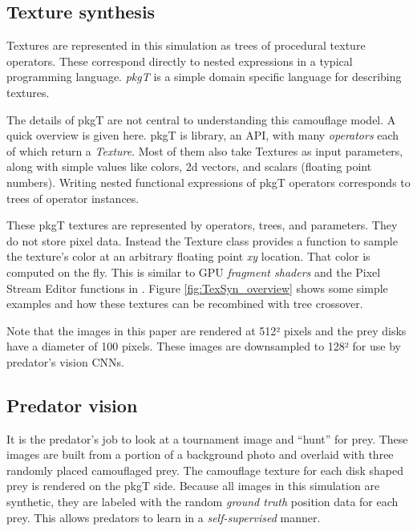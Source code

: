 \documentclass[acmtog]{acmart}
\newcommand{\jargon}[1]{\textit{#1}}
\newcommand{\texsyn}[0]{pkgT}
\begin{document}
\subsection{Texture synthesis}
\label{subsec:texture_synthesis}
Textures are represented in this simulation as trees of procedural texture operators. These correspond directly to nested expressions in a typical programming language. \jargon{\texsyn{}} is a simple domain specific language for describing textures.
\par
The details of \texsyn{} are not central to understanding this camouflage model. A quick overview is given here. \texsyn{} is library, an API, with many \jargon{operators} each of which return a \jargon{Texture}. Most of them also take Textures as input parameters, along with simple values like colors, 2d vectors, and scalars (floating point numbers). Writing nested functional expressions of \texsyn{} operators corresponds to trees of operator instances.
\par
These \texsyn{} textures are represented by operators, trees, and parameters. They do not store pixel data. Instead the Texture class provides a function to sample the texture's color at an arbitrary floating point \textit{xy} location. That color is computed on the fly. This is similar to GPU \jargon{fragment shaders} and the Pixel Stream Editor functions in \citet{perlin_image_1985}. Figure \ref{fig:TexSyn_overview} shows some simple examples and how these textures can be recombined with tree crossover.
\par
Note that the images in this paper are rendered at 512² pixels and the prey disks have a diameter of 100 pixels. These images are downsampled to 128² for use by predator's vision CNNs.
\par


\subsection{Predator vision}
It is the predator's job to look at a tournament image and “hunt” for prey. These images are built from a portion of a background photo and overlaid with three randomly placed camouflaged prey. The camouflage texture for each disk shaped prey is rendered on the \texsyn{} side. Because all images in this simulation are synthetic, they are labeled with the random \jargon{ground truth} position data for each prey. This allows predators to learn in a \jargon{self-supervised} manner.
\par
\end{document}
